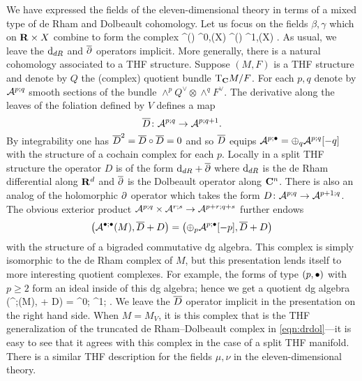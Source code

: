 \documentclass[11pt]{amsart}%
\newcommand{\thfd}{\Bar{D}}
\newcommand{\thfdel}{D}
\begin{document}
We have expressed the fields of the eleven-dimensional theory in terms of a mixed type of de Rham and Dolbeault cohomology. 
Let us focus on the fields $\beta,\gamma$ which on $\mathbf{R} \times X$ combine to form the complex 
\beqn\label{eqn:drdol}
\Omega^{\bu}(\R) \otimes \Omega^{0,\bu}(X) \xto{1 \otimes \del} \Omega^{\bu}(\R) \otimes \Omega^{1,\bu}(X) .
\eeqn
As usual, we leave the ${\rm d}_{dR}$ and $\overline{\partial}$ operators implicit.
More generally, there is a natural cohomology associated to a THF structure.
Suppose $(M,F)$ is a THF structure and 
denote by $Q$ the (complex) quotient bundle ${\rm T}_{\mathbf{C}} M / F$.
For each $p,q$ denote by $\mathcal A^{p;q}$ smooth sections of the bundle $\wedge^p Q^\vee \otimes \wedge^q F^\vee$. 
The derivative along the leaves of the foliation defined by $V$ defines a map 
\[
\thfd \colon \cA^{p;q} \to \cA^{p;q+1}  .
\]
By integrability one has $\thfd^2 = \thfd \circ \thfd = 0$ and so $\thfd$ equips $\mathcal A^{p;\bullet} = \oplus_q \mathcal A^{p;q}[-q]$ with the structure of a cochain complex for each $p$. 
Locally in a split THF structure the operator $D$ is of the form ${\rm d}_{dR} + \overline{\partial}$ where ${\rm d}_{dR}$ is the de Rham differential along $\mathbf{R}^d$ and $\overline{\partial}$ is the Dolbeault operator along $\mathbf{C}^n$. 
There is also an analog of the holomorphic $\partial$ operator which takes the form $\thfdel \colon \cA^{p;q} \to \cA^{p+1;q}$. 
The obvious exterior product $\mathcal A^{p;q} \times \mathcal A^{r;s} \to \mathcal A^{p+r;q+s}$ further endows 
\[
\left(\cA^{\bu;\bu} (M), \thfd + \thfdel\right) = \left(\oplus_p \cA^{p;\bu}[-p] , \thfd + \thfdel \right) 
\]
with the structure of a bigraded commutative dg algebra.
This complex is simply isomorphic to the de Rham complex of $M$, but this presentation lends itself to more interesting quotient complexes. 
For example, the forms of type $(p,\bullet)$ with $p \geq 2$ form an ideal inside of this dg algebra; hence we get a quotient dg algebra 
\beqn\label{thfcoh1}
\left(\cA^{;\bu}(M), \thfd + \thfdel\right) = \quad \cA^{0;\bu} \xto{\thfdel} \cA^{1;\bu} .
\eeqn
We leave the $\thfd$ operator implicit in the presentation on the right hand side.
When $M = M_V$, it is this complex that is the THF generalization of the truncated de Rham--Dolbeault complex in \eqref{eqn:drdol}---it is easy to see that it agrees with this complex in the case of a split THF manifold.
There is a similar THF description for the fields $\mu,\nu$ in the eleven-dimensional theory.
\end{document}
